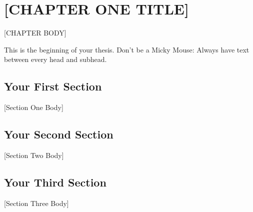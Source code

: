 \chapter{[CHAPTER ONE TITLE]}
[CHAPTER BODY]

This is the beginning of your thesis. Don't be a Micky
Mouse\cite{mm2}: Always have text between every head and subhead.

\section{Your First Section}
[Section One Body]
\section{Your Second Section}
[Section Two Body]
\section{Your Third Section}
[Section Three Body]